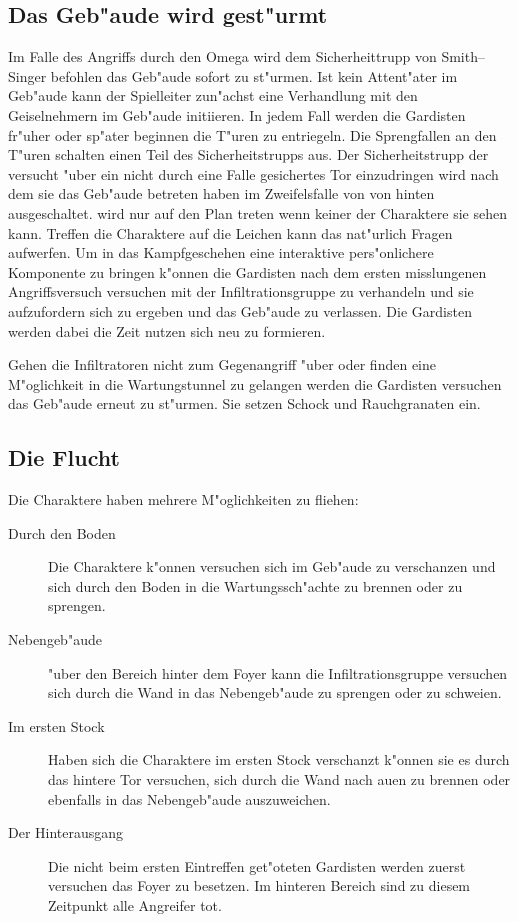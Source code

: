 \subsection{Das Geb"aude wird gest"urmt} 
Im Falle des Angriffs durch den Omega wird dem Sicherheittrupp von Smith--Singer befohlen das Geb"aude sofort zu st"urmen. Ist kein Attent"ater im Geb"aude kann der Spielleiter zun"achst eine Verhandlung mit den Geiselnehmern im Geb"aude initiieren. In jedem Fall werden die Gardisten fr"uher oder sp"ater beginnen die T"uren zu entriegeln. Die Sprengfallen an den T"uren schalten einen Teil des Sicherheitstrupps aus. Der Sicherheitstrupp der versucht "uber ein nicht durch eine Falle gesichertes Tor einzudringen wird nach dem sie das Geb"aude betreten haben im Zweifelsfalle von \xl{} von hinten ausgeschaltet. \xl{} wird nur auf den Plan treten wenn keiner der Charaktere sie sehen kann. Treffen die Charaktere auf die Leichen kann das nat"urlich Fragen aufwerfen. Um in das Kampfgeschehen eine interaktive pers"onlichere Komponente zu bringen k"onnen die Gardisten nach dem ersten misslungenen Angriffsversuch versuchen mit der Infiltrationsgruppe zu verhandeln und sie aufzufordern sich zu ergeben und das Geb"aude zu verlassen. Die Gardisten werden dabei die Zeit nutzen sich neu zu formieren.

Gehen die Infiltratoren nicht zum Gegenangriff "uber oder finden eine M"oglichkeit in die Wartungstunnel zu gelangen werden die Gardisten versuchen das Geb"aude erneut zu st"urmen. Sie setzen Schock und Rauchgranaten ein.

\subsection{Die Flucht} 
Die Charaktere haben mehrere M"oglichkeiten zu fliehen:

\begin{description}
	\item [Durch den Boden] Die Charaktere k"onnen versuchen sich im Geb"aude zu verschanzen und sich durch den Boden in die 		
		Wartungssch"achte zu brennen oder zu sprengen.
	\item [Nebengeb"aude] "uber den Bereich hinter dem Foyer kann die Infiltrationsgruppe versuchen sich durch die Wand in das 		
		Nebengeb"aude zu sprengen oder zu schwei\3en.
	\item [Im ersten Stock] Haben sich die Charaktere im ersten Stock verschanzt k"onnen sie es durch das hintere Tor versuchen, 
		  sich 	durch die Wand nach au\3en zu brennen oder ebenfalls in das Nebengeb"aude auszuweichen.
	\item [Der Hinterausgang] Die nicht beim ersten Eintreffen get"oteten Gardisten werden zuerst versuchen das Foyer zu besetzen. Im hinteren Bereich sind zu diesem Zeitpunkt alle Angreifer tot.	
\end{description}

